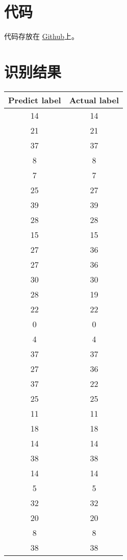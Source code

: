 \documentclass[a4paper]{article}
\begin{document}
\begin{CJK}{UTF8}{gbsn}
	\section*{代码}
	代码存放在
	\href{https://github.com/leeshuheng/toy_knn_face_rec/blob/master/blog_main.cpp}
	{Github}上。

	\section*{识别结果}
	\begin{center}
	\begin{tabular}{|c|c|}
		\hline
		\textbf{Predict label} & \textbf{Actual label} \\\hline
		14   &  14  \\\hline
		21   &  21  \\\hline
		37   &  37  \\\hline
		8   &  8  \\\hline
		7   &  7  \\\hline
		25   &  27  \\\hline
		39   &  39  \\\hline
		28   &  28  \\\hline
		15   &  15  \\\hline
		27   &  36  \\\hline
		27   &  36  \\\hline
		30   &  30  \\\hline
		28   &  19  \\\hline
		22   &  22  \\\hline
		0   &  0  \\\hline
		4   &  4  \\\hline
		37   &  37  \\\hline
		27   &  36  \\\hline
		37   &  22  \\\hline
		25   &  25  \\\hline
		11   &  11  \\\hline
		18   &  18  \\\hline
		14   &  14  \\\hline
		38   &  38  \\\hline
		14   &  14  \\\hline
		5   &  5  \\\hline
		32   &  32  \\\hline
		20   &  20  \\\hline
		8   &  8  \\\hline
		38   &  38  \\\hline

\end{tabular}
\end{center}
\end{CJK}
\end{document}
